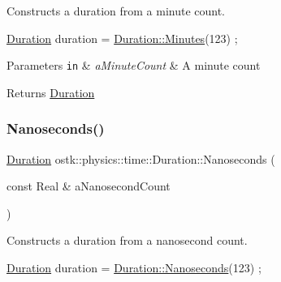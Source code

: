 Constructs a duration from a minute count. 


\begin{DoxyCode}
\hyperlink{classostk_1_1physics_1_1time_1_1_duration_a6ba3a020742ca6e3bf0b1970dd039c07}{Duration} duration = \hyperlink{classostk_1_1physics_1_1time_1_1_duration_a1cd2884c6bb89071780c7dffcba9b49f}{Duration::Minutes}(123) ;
\end{DoxyCode}



\begin{DoxyParams}[1]{Parameters}
\mbox{\tt in}  & {\em a\+Minute\+Count} & A minute count \\
\hline
\end{DoxyParams}
\begin{DoxyReturn}{Returns}
\hyperlink{classostk_1_1physics_1_1time_1_1_duration}{Duration} 
\end{DoxyReturn}
\mbox{\label{classostk_1_1physics_1_1time_1_1_duration_a81e8036be5cf9ee2f0108ac955642c96}} 
\subsubsection{\texorpdfstring{Nanoseconds()}{Nanoseconds()}}
{\footnotesize\ttfamily \hyperlink{classostk_1_1physics_1_1time_1_1_duration}{Duration} ostk\+::physics\+::time\+::\+Duration\+::\+Nanoseconds (\begin{DoxyParamCaption}\item[{const Real \&}]{a\+Nanosecond\+Count }\end{DoxyParamCaption})\hspace{0.3cm}{\ttfamily [static]}}



Constructs a duration from a nanosecond count. 


\begin{DoxyCode}
\hyperlink{classostk_1_1physics_1_1time_1_1_duration_a6ba3a020742ca6e3bf0b1970dd039c07}{Duration} duration = \hyperlink{classostk_1_1physics_1_1time_1_1_duration_a81e8036be5cf9ee2f0108ac955642c96}{Duration::Nanoseconds}(123) ;
\end{DoxyCode}



